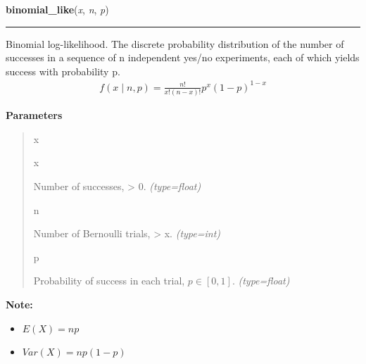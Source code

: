     \begin{boxedminipage}{\textwidth}

    \raggedright \textbf{binomial\_like}(\textit{x}, \textit{n}, \textit{p})

    \vspace{-1.5ex}

    \rule{\textwidth}{0.5\fboxrule}

Binomial log-likelihood.  The discrete probability distribution of the
number of successes in a sequence of n independent yes/no experiments,
each of which yields success with probability p.
\begin{equation*}\begin{split}f(x \mid n, p) = \frac{n!}{x!(n-x)!} p^x (1-p)^{1-x}\end{split}\end{equation*}    \vspace{1ex}

      \textbf{Parameters}
      \begin{quote}
        \begin{Ventry}{x}

          \item[x]


Number of successes, {\textgreater} 0.
            \textit{(type=float)}

          \item[n]


Number of Bernoulli trials, {\textgreater} x.
            \textit{(type=int)}

          \item[p]


Probability of success in each trial, $p \in [0,1]$.
            \textit{(type=float)}

        \end{Ventry}

      \end{quote}

    \vspace{1ex}

\textbf{Note:} \begin{itemize}
\item {} 
$E(X)=np$

\item {} 
$Var(X)=np(1-p)$

\end{itemize}


    \end{boxedminipage}

